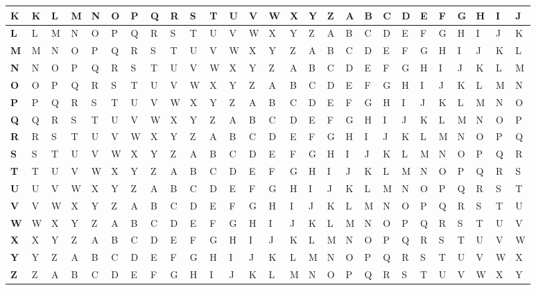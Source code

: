\begin{table}[h!]
{\begin{tabular}{l|l|l|l|l|l|l|l|l|l|l|l|l|l|l|l|l|l|l|l|l|l|l|l|l|l|l|}
\multicolumn{1}{|l|}{\textbf{K}} & K & L & M & N & O & P & Q & R & S & T & U & V & W & X & Y & Z & A & B & C & D & E & F & G & H & I & J \\ \hline
\multicolumn{1}{|l|}{\textbf{L}} & L & M & N & O & P & Q & R & S & T & U & V & W & X & Y & Z & A & B & C & D & E & F & G & H & I & J & K \\ \hline
\multicolumn{1}{|l|}{\textbf{M}} & M & N & O & P & Q & R & S & T & U & V & W & X & Y & Z & A & B & C & D & E & F & G & H & I & J & K & L \\ \hline
\multicolumn{1}{|l|}{\textbf{N}} & N & O & P & Q & R & S & T & U & V & W & X & Y & Z & A & B & C & D & E & F & G & H & I & J & K & L & M \\ \hline
\multicolumn{1}{|l|}{\textbf{O}} & O & P & Q & R & S & T & U & V & W & X & Y & Z & A & B & C & D & E & F & G & H & I & J & K & L & M & N \\ \hline
\multicolumn{1}{|l|}{\textbf{P}} & P & Q & R & S & T & U & V & W & X & Y & Z & A & B & C & D & E & F & G & H & I & J & K & L & M & N & O \\ \hline
\multicolumn{1}{|l|}{\textbf{Q}} & Q & R & S & T & U & V & W & X & Y & Z & A & B & C & D & E & F & G & H & I & J & K & L & M & N & O & P \\ \hline
\multicolumn{1}{|l|}{\textbf{R}} & R & S & T & U & V & W & X & Y & Z & A & B & C & D & E & F & G & H & I & J & K & L & M & N & O & P & Q \\ \hline
\multicolumn{1}{|l|}{\textbf{S}} & S & T & U & V & W & X & Y & Z & A & B & C & D & E & F & G & H & I & J & K & L & M & N & O & P & Q & R \\ \hline
\multicolumn{1}{|l|}{\textbf{T}} & T & U & V & W & X & Y & Z & A & B & C & D & E & F & G & H & I & J & K & L & M & N & O & P & Q & R & S \\ \hline
\multicolumn{1}{|l|}{\textbf{U}} & U & V & W & X & Y & Z & A & B & C & D & E & F & G & H & I & J & K & L & M & N & O & P & Q & R & S & T \\ \hline
\multicolumn{1}{|l|}{\textbf{V}} & V & W & X & Y & Z & A & B & C & D & E & F & G & H & I & J & K & L & M & N & O & P & Q & R & S & T & U \\ \hline
\multicolumn{1}{|l|}{\textbf{W}} & W & X & Y & Z & A & B & C & D & E & F & G & H & I & J & K & L & M & N & O & P & Q & R & S & T & U & V \\ \hline
\multicolumn{1}{|l|}{\textbf{X}} & X & Y & Z & A & B & C & D & E & F & G & H & I & J & K & L & M & N & O & P & Q & R & S & T & U & V & W \\ \hline
\multicolumn{1}{|l|}{\textbf{Y}} & Y & Z & A & B & C & D & E & F & G & H & I & J & K & L & M & N & O & P & Q & R & S & T & U & V & W & X \\ \hline
\multicolumn{1}{|l|}{\textbf{Z}} & Z & A & B & C & D & E & F & G & H & I & J & K & L & M & N & O & P & Q & R & S & T & U & V & W & X & Y \\ \hline
\end{tabular}%
}
\end{table}

